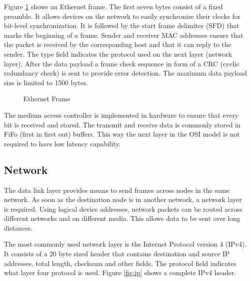 Figure \ref{fig:eth} shows an Ethernet frame. The first seven bytes consist of a fixed preamble. It allows devices on the network to easily synchronize their 
clocks for bit-level synchronization. It is followed by the start frame delimiter (SFD) that marks the beginning of a frame. Sender and receiver MAC addresses ensure that the packet is received by the corresponding host and that it can reply to the sender. The type field indicates the protocol used on the next layer (network layer). After the data payload a frame check sequence in form of a CRC (cyclic redundancy check) is sent to provide error detection. The maximum data payload size is limited to 1500 bytes.

\begin{figure}[tb!]
    \centering
    \begin{adjustbox}{max width=\textwidth}
        
    \end{adjustbox}
    \caption{Ethernet Frame}
    \label{fig:eth}
\end{figure}
The medium access controller is implemented in hardware to ensure that every bit is received and stored. The transmit and receive data is commonly stored in
FiFo (first in first out) buffers. This way the next layer in the OSI model is
not required to have low latency capability.


\subsection{Network} 
The data link layer provides means to send frames across nodes in the same
network. As soon as the destination node is in another network, a network layer
is required. Using logical device addresses, network packets can be routed
across different networks and on different media. This allows data to be sent
over long distances.

The most commonly used network layer is the Internet Protocol version 4 (IPv4).
It consists of a 20 byte sized header that contains destination and source IP
addresses, total length, checksum and other fields. The protocol field indicates what layer four protocol is used. Figure \ref{fig:ip} shows a complete IPv4 header.

